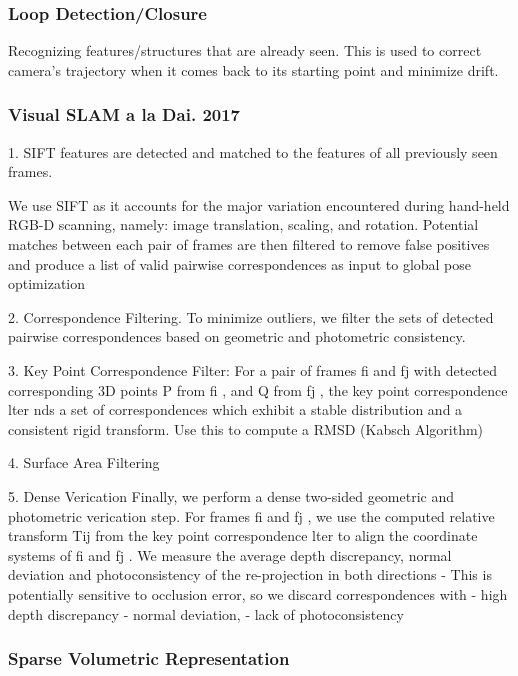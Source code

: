 \subsubsection{Loop Detection/Closure}

Recognizing features/structures that are already seen. This is used to correct camera's trajectory when it comes back to its starting point and minimize drift.

\subsubsection{Visual SLAM a la Dai. 2017}

1. SIFT features are detected and matched to the features of all previously seen frames. 

We use SIFT as it accounts for the major variation encountered during hand-held RGB-D scanning, namely: image translation, scaling, and rotation. Potential matches between each pair of frames are then filtered to remove false positives and produce a list of valid pairwise correspondences as input to global pose optimization

2. Correspondence Filtering. To minimize outliers, we filter the sets of detected pairwise correspondences based on geometric and photometric consistency.

3. Key Point Correspondence Filter: For a pair of frames fi and fj with detected corresponding 3D points P from fi , and Q from fj , the key point correspondence lter nds a set of correspondences which exhibit a stable distribution and a consistent rigid transform. Use this to compute a RMSD (Kabsch Algorithm)

4. Surface Area Filtering

5. Dense Verication Finally, we perform a dense two-sided geometric and photometric verication step. For frames fi and fj , we use the computed relative transform Tij from the key point correspondence lter to align the coordinate systems of fi and fj . We measure the average depth discrepancy, normal deviation and photoconsistency of the re-projection in both directions
   - This is potentially sensitive to occlusion error, so we discard correspondences with 
   - high depth discrepancy
   - normal deviation,
   - lack of photoconsistency

\subsubsection{Sparse Volumetric Representation}


